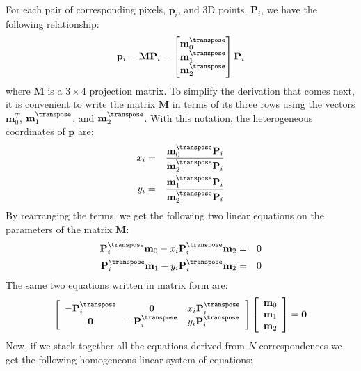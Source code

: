 For each pair of corresponding pixels, $\mathbf{p}_i$, and 3D points, $\mathbf{P}_i$, we have the following relationship:
\begin{equation}
\mathbf{p}_i = 
    \mathbf{M}
    \mathbf{P}_i
    =
    \begin{bmatrix}
    \mathbf{m}_0^\transpose \\
    \mathbf{m}_1^\transpose \\
    \mathbf{m}_2^\transpose
    \end{bmatrix}
    \mathbf{P}_i
\end{equation}
where $\mathbf{M}$ is a $3\times 4$ projection matrix. To simplify the derivation that comes next, it is convenient to write the matrix $\mathbf{M}$ in terms of its three rows using the vectors $\mathbf{m}_0^T$, $\mathbf{m}_1^\transpose$, and $\mathbf{m}_2^\transpose$. With this notation, the heterogeneous coordinates of $\mathbf{p}$ are: 
\begin{eqnarray}
x_i &=& \frac{\mathbf{m}_0^\transpose \mathbf{P}_i}{\mathbf{m}_2^\transpose \mathbf{P}_i} \\
y_i &=& \frac{\mathbf{m}_1^\transpose \mathbf{P}_i}{\mathbf{m}_2^\transpose \mathbf{P}_i}
\end{eqnarray}
By rearranging the terms, we get the following two linear equations on the parameters of the matrix $\mathbf{M}$:
\begin{eqnarray}
\mathbf{P}_i^\transpose \mathbf{m}_0 - x_i \mathbf{P}_i^\transpose \mathbf{m}_2 &=& 0\\
\mathbf{P}_i^\transpose \mathbf{m}_1 - y_i \mathbf{P}_i^\transpose \mathbf{m}_2 &=& 0
\end{eqnarray}
The same two equations written in matrix form are:
\begin{equation}
    \left [
    \begin{array}{ccc}
    -\mathbf{P}_i^\transpose & \mathbf{0} & x_i \mathbf{P}_i^\transpose\\
    \mathbf{0} & -\mathbf{P}_i^\transpose & y_i \mathbf{P}_i^\transpose
    \end{array}
    \right ]
    \left [
    \begin{array}{c}
    \mathbf{m}_0 \\
    \mathbf{m}_1 \\
    \mathbf{m}_2
    \end{array}
    \right]
    = 
    \mathbf{0}
\end{equation}
Now, if we stack together all the equations derived from $N$ correspondences we get the following homogeneous linear system of equations:
